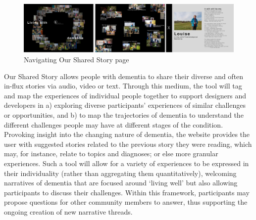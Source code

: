 \begin{figure}[h]
\centering
\includegraphics[width=1\linewidth]{Images/D3Toolkit/Fig5.png}
\caption{Navigating Our Shared Story page}
\label{fig:OurSharedStory}
\end{figure}
Our Shared Story allows people with dementia to share their diverse and often in-flux stories via audio, video or text. Through this medium, the tool will tag and map the experiences of individual people together to support designers and developers in a) exploring diverse participants’ experiences of similar challenges or opportunities, and b) to map the trajectories of dementia to understand the different challenges people may have at different stages of the condition. Provoking insight into the changing nature of dementia, the website provides the user with suggested stories related to the previous story they were reading, which may, for instance, relate to topics and diagnoses; or else more granular experiences. Such a tool will allow for a variety of experiences to be expressed in their individuality (rather than aggregating them quantitatively), welcoming narratives of dementia that are focused around ‘living well’ but also allowing participants to discuss their challenges. Within this framework, participants may propose questions for other community members to answer, thus supporting the ongoing creation of new narrative threads. 

